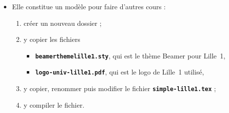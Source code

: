   \begin{itemize}
  \item Elle constitue un modèle pour faire d'autres cours :
      
    \begin{enumerate}
    \item créer un nouveau dossier ;
    \item y copier les fichiers 
      
      \begin{itemize}
      \item \texttt{\textbf{beamerthemelille1.sty}}, qui est le thème Beamer pour Lille~1,
      \item \texttt{\textbf{logo-univ-lille1.pdf}}, qui est le logo de Lille~1 utilisé,
      \end{itemize}
      
    \item y copier, renommer puis modifier le fichier \texttt{\textbf{simple-lille1.tex}} ;
    \item y compiler le fichier.
    \end{enumerate}
  \end{itemize}
